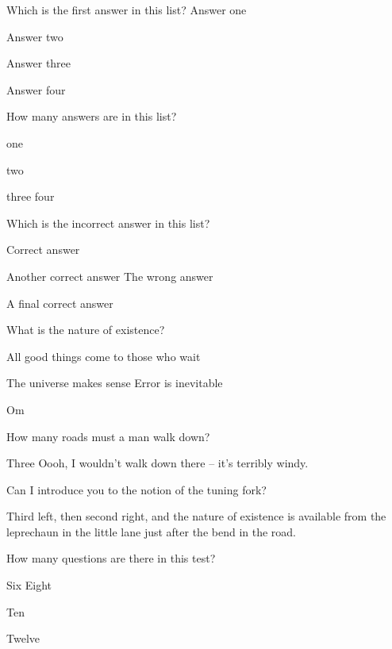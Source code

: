 \documentclass[draft]{exam-n}
\begin{document}
\maketitle

\begin{mcq}
Which is the first answer in this list?
\answer Answer one
\item Answer two
\item Answer three
\item Answer four
\end{mcq}

\begin{mcq}
How many answers are in this list?
\item one
\item two
\item three
\answer four
\end{mcq}

\begin{mcq}
Which is the incorrect answer in this list?
\item Correct answer
\item Another correct answer
\answer The wrong answer
\item A final correct answer
\end{mcq}

\begin{mcq}
What is the nature of existence?
\item All good things come to those who wait
\item The universe makes sense
\answer Error is inevitable
\item Om
\end{mcq}

\begin{mcq}
How many roads must a man walk down?
\item Three
\answer Oooh, I wouldn't walk down there -- it's terribly windy.
\item Can I introduce you to the notion of the tuning fork?
\item Third left, then second right, and the nature of existence is
  available from the leprechaun in the little lane just after the bend
  in the road.
\end{mcq}

\begin{mcq}
How many questions are there in this test?
\item Six
\answer Eight
\item Ten
\item Twelve
\end{mcq}
\end{document}
